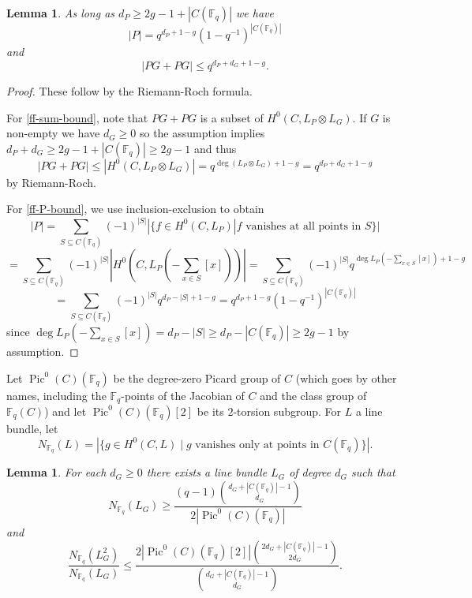 \documentclass{amsart}
\numberwithin{equation}{section}
\newcommand{\abs}[1]{\mathopen{}\left| #1\mathclose{}\right|}
\newtheorem{lemma}[theorem]{Lemma}
\begin{document}
\begin{lemma}\label{ff-rr} As long as $d_P \geq 2g-1 +\abs{C(\mathbb F_q)}$ we have 
\begin{equation}\label{ff-P-bound} |P| = q^{ d_P + 1-g} (1-q^{-1})^{|C(\mathbb F_q)|} \end{equation}
and
\begin{equation}\label{ff-sum-bound}|PG + PG| \leq q^{ d_P+d_G  + 1-g} .\end{equation}
\end{lemma}
\begin{proof} These follow by the Riemann-Roch formula.

For \eqref{ff-sum-bound}, note that $PG+ PG$ is a subset of $H^0(C, L_P \otimes L_G)$. If $G$ is non-empty we have $d_G\geq 0$ so the assumption implies $d_P +d_G \geq   2g-1 +\abs{ C(\mathbb F_q)}\geq 2g-1$ and thus 
\[|PG + PG|  \leq |H^0(C,L_P \otimes L_G)| =q^{ \deg( L_P \otimes L_G )+ 1-g} = q^{d_P +d_G +1-g} \] by Riemann-Roch.

For \eqref{ff-P-bound}, we use inclusion-exclusion to obtain
\[ |P|= \sum_{S \subseteq C(\mathbb F_q)} (-1)^{|S|} |\{ f\in H^0(C, L_P) | f \textrm{ vanishes at all points in } S\}|\]\[=  \sum_{S \subseteq C(\mathbb F_q)}  (-1)^{|S|} |H^0(C, L_P (- \sum_{x\in S}[x]))| =  \sum_{S \subseteq C(\mathbb F_q)}  (-1)^{|S|}  q^{ \deg L_P(- \sum_{x\in S}[x])+1-g} \]\[= \sum_{S \subseteq C(\mathbb F_q)}  (-1)^{|S|} q^{ d_P - |S| + 1-g}= q^{ d_P + 1-g} (1-q^{-1})^{|C(\mathbb F_q)|} \]
since $\deg L_P(- \sum_{x\in S}[x]) = d_P - |S| \geq d_P - |C(\mathbb F_q)|  \geq 2g-1$ by assumption. \end{proof}

Let $\operatorname{Pic}^0(C)(\mathbb F_q)$ be the degree-zero Picard group of $C$ (which goes by other names, including the $\mathbb F_q$-points of the Jacobian of $C$ and the class group of $\mathbb F_q(C)$) and let $\operatorname{Pic}^0(C)(\mathbb F_q)[2]$ be its $2$-torsion subgroup. For $L$ a line bundle, let 
\[ N_{\mathbb F_q}(L) = |\{ g \in H^0(C, L) \mid g \textrm{ vanishes only at points in } C(\mathbb F_q)\}|.\]

\begin{lemma}\label{ff-pm} For each $d_G \geq 0$ there exists a line bundle $L_G$ of degree $d_G$ such that
\begin{equation}\label{ff-G-bound} N_{\mathbb F_q}(L_G) \geq \frac{ (q-1)   \binom{d_G + |C(\mathbb F_q)|-1}{d_G}}{ 2|\operatorname{Pic}^0(C)(\mathbb F_q)|}\end{equation}
and
\begin{equation}\label{ff-almost-product-bound} \frac{ N_{\mathbb F_q}(L_G^2)}{N_{\mathbb F_q}(L_G)} \leq \frac{ 2 |\operatorname{Pic}^0(C)(\mathbb F_q)[2]| \binom{2d_G + |C(\mathbb F_q)|-1}{2d_G}}{ \binom{d_G + |C(\mathbb F_q)|-1}{d_G}}.\end{equation}\end{lemma}
\end{document}
